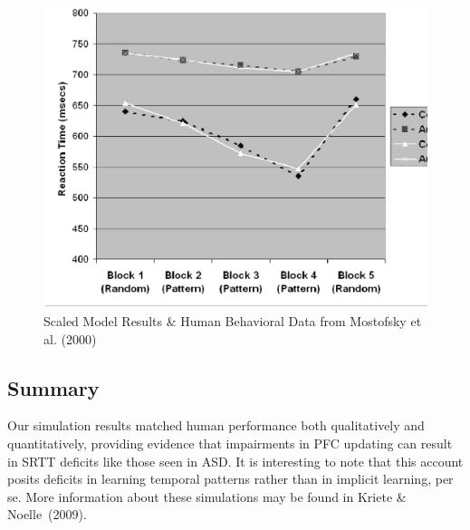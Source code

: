 \begin{figure}[t]
\begin{center}
	\includegraphics[width=115mm]{graphs/srtt_chart.ps}
\end{center}
\caption{Scaled Model Results \& Human Behavioral Data from Mostofsky
         et al. (2000)} 
\label{Model-Results}
\end{figure} 

\subsection{Summary}

Our simulation results matched human performance both qualitatively and quantitatively, providing evidence that impairments in PFC updating can result in SRTT deficits like those seen in ASD. It is interesting to note that this account posits deficits in learning temporal patterns rather than in implicit learning, per se. More information about these simulations may be found in Kriete \& Noelle~(2009).\nocite{KrieteT:2009:SRTT}

